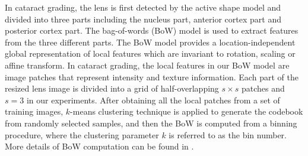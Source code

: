 \documentclass[journal]{IEEEtran}
\begin{document}
 In cataract grading,  the lens is first detected by the active shape model \cite{5415679} and divided into three parts including the nucleus part, anterior cortex part and posterior cortex part.  The  bag-of-words (BoW) model \cite{bow} is used to extract features   from the three different parts. 
 The BoW model provides a location-independent global representation of local features  
 which are invariant to    rotation, scaling or affine transform.  In cataract grading, the local features in our BoW model are image patches that represent  intensity and texture information. Each part of the resized lens image is divided into  a grid of half-overlapping $s\times s$  patches and $s=3$ in our experiments.   
 After obtaining all the local patches from a set of training images, $k$-means clustering technique is applied to generate the codebook from randomly selected samples, and then the BoW is computed  from a binning procedure, where the clustering parameter $k$ is referred to as the bin number.
 More details of BoW computation can be found in \cite{bow}.
  
\end{document}
